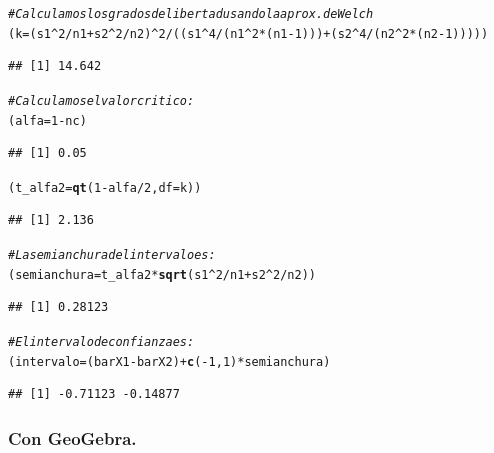 \documentclass[10pt,a4paper]{article}\usepackage[]{graphicx}\usepackage[]{color}
\makeatletter
\newcommand{\hlnum}[1]{\textcolor[rgb]{0.686,0.059,0.569}{#1}}%
\newcommand{\hlcom}[1]{\textcolor[rgb]{0.678,0.584,0.686}{\textit{#1}}}%
\newcommand{\hlopt}[1]{\textcolor[rgb]{0,0,0}{#1}}%
\newcommand{\hlstd}[1]{\textcolor[rgb]{0.345,0.345,0.345}{#1}}%
\newcommand{\hlkwb}[1]{\textcolor[rgb]{0.69,0.353,0.396}{#1}}%
\newcommand{\hlkwc}[1]{\textcolor[rgb]{0.333,0.667,0.333}{#1}}%
\newcommand{\hlkwd}[1]{\textcolor[rgb]{0.737,0.353,0.396}{\textbf{#1}}}%
\newenvironment{kframe}{%
 \def\at@end@of@kframe{}%
 \ifinner\ifhmode%
  \def\at@end@of@kframe{\end{minipage}}%
  \begin{minipage}{\columnwidth}%
 \fi\fi%
 \def\FrameCommand##1{\hskip\@totalleftmargin \hskip-\fboxsep
 \colorbox{shadecolor}{##1}\hskip-\fboxsep
     \hskip-\linewidth \hskip-\@totalleftmargin \hskip\columnwidth}%
 \MakeFramed {\advance\hsize-\width
   \@totalleftmargin\z@ \linewidth\hsize
   \@setminipage}}%
 {\par\unskip\endMakeFramed%
 \at@end@of@kframe}
\newenvironment{knitrout}{}{} %
\makeatother
\begin{document}
\begin{knitrout}
\begin{kframe}
\begin{alltt}
\hlcom{# Calculamos los grados de libertad usando la aprox. de Welch}
\hlstd{(k} \hlkwb{=} \hlstd{(s1}\hlopt{^}\hlnum{2}\hlopt{/}\hlstd{n1} \hlopt{+} \hlstd{s2}\hlopt{^}\hlnum{2}\hlopt{/}\hlstd{n2)}\hlopt{^}\hlnum{2} \hlopt{/} \hlstd{((s1}\hlopt{^}\hlnum{4}\hlopt{/}\hlstd{(n1}\hlopt{^}\hlnum{2} \hlopt{*} \hlstd{(n1} \hlopt{-} \hlnum{1}\hlstd{)))} \hlopt{+} \hlstd{(s2}\hlopt{^}\hlnum{4} \hlopt{/} \hlstd{(n2}\hlopt{^}\hlnum{2} \hlopt{*} \hlstd{(n2} \hlopt{-} \hlnum{1}\hlstd{)))))}
\end{alltt}
\begin{verbatim}
## [1] 14.642
\end{verbatim}
\begin{alltt}
\hlcom{# Calculamos el valor critico:}
\hlstd{(alfa} \hlkwb{=} \hlnum{1} \hlopt{-} \hlstd{nc)}
\end{alltt}
\begin{verbatim}
## [1] 0.05
\end{verbatim}
\begin{alltt}
\hlstd{(t_alfa2} \hlkwb{=} \hlkwd{qt}\hlstd{(}\hlnum{1}\hlopt{-}\hlstd{alfa}\hlopt{/}\hlnum{2}\hlstd{,} \hlkwc{df}\hlstd{=k))}
\end{alltt}
\begin{verbatim}
## [1] 2.136
\end{verbatim}
\begin{alltt}
\hlcom{#La semianchura del intervalo es:}
\hlstd{(semianchura} \hlkwb{=} \hlstd{t_alfa2} \hlopt{*} \hlkwd{sqrt}\hlstd{(s1}\hlopt{^}\hlnum{2}\hlopt{/}\hlstd{n1} \hlopt{+} \hlstd{s2}\hlopt{^}\hlnum{2}\hlopt{/}\hlstd{n2))}
\end{alltt}
\begin{verbatim}
## [1] 0.28123
\end{verbatim}
\begin{alltt}
\hlcom{# El intervalo de confianza es:}
\hlstd{(intervalo} \hlkwb{=} \hlstd{(barX1} \hlopt{-} \hlstd{barX2)} \hlopt{+} \hlkwd{c}\hlstd{(}\hlopt{-}\hlnum{1}\hlstd{,} \hlnum{1}\hlstd{)} \hlopt{*} \hlstd{semianchura  )}
\end{alltt}
\begin{verbatim}
## [1] -0.71123 -0.14877
\end{verbatim}
\end{kframe}
\end{knitrout}

\subsubsection*{Con GeoGebra.}
\end{document}
